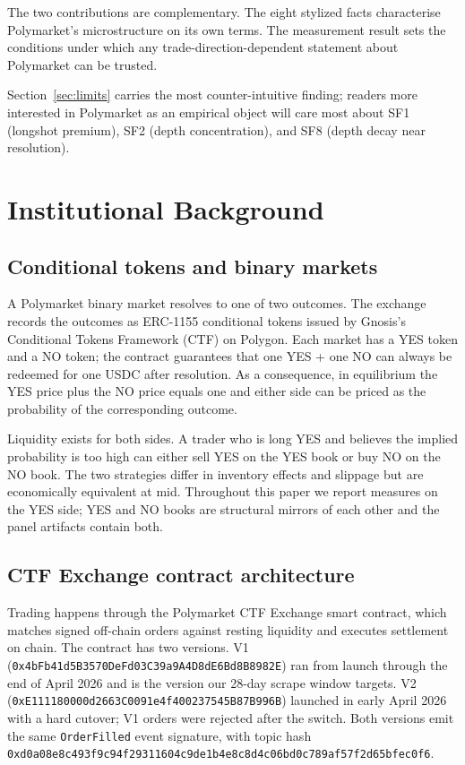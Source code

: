 \documentclass[11pt,a4paper,twocolumn]{article}
\begin{document}
The two contributions are complementary. The eight stylized facts
characterise Polymarket's microstructure on its own terms. The
measurement result sets the conditions under which any
trade-direction-dependent statement about Polymarket can be trusted.

Section~\ref{sec:limits} carries the most counter-intuitive finding;
readers more interested in Polymarket as an empirical object will
care most about SF1 (longshot premium), SF2 (depth concentration),
and SF8 (depth decay near resolution).
\section{Institutional Background}\label{sec:background}

\subsection{Conditional tokens and binary markets}

A Polymarket binary market resolves to one of two outcomes. The
exchange records the outcomes as ERC-1155 conditional tokens issued
by Gnosis's Conditional Tokens Framework (CTF) on Polygon. Each
market has a YES token and a NO token; the contract guarantees that
one YES + one NO can always be redeemed for one USDC after
resolution. As a consequence, in equilibrium the YES price plus the
NO price equals one and either side can be priced as the
probability of the corresponding outcome.

Liquidity exists for both sides. A trader who is long YES and
believes the implied probability is too high can either sell YES on
the YES book or buy NO on the NO book. The two strategies differ in
inventory effects and slippage but are economically equivalent at
mid. Throughout this paper we report measures on the YES side; YES
and NO books are structural mirrors of each other and the panel
artifacts contain both.

\subsection{CTF Exchange contract architecture}

Trading happens through the Polymarket CTF Exchange smart contract,
which matches signed off-chain orders against resting liquidity and
executes settlement on chain. The contract has two versions. V1
(\texttt{0x4bFb41d5\allowbreak B3570DeFd03\allowbreak C39a9A4D8dE6Bd8\allowbreak B8982E})
ran from launch through the end of April 2026 and is the version our
28-day scrape window targets. V2
(\texttt{0xE111180000d2663C\allowbreak 0091e4f400237545\allowbreak B87B996B})
launched in early April 2026 with a hard cutover; V1 orders were
rejected after the switch. Both versions emit the same
\texttt{OrderFilled} event signature, with topic hash
\texttt{0xd0a08e8c\allowbreak 493f9c94f29311604c9de\allowbreak 1b4e8c8d4c06bd0c789af57f2d65bfec0f6}.
\end{document}
